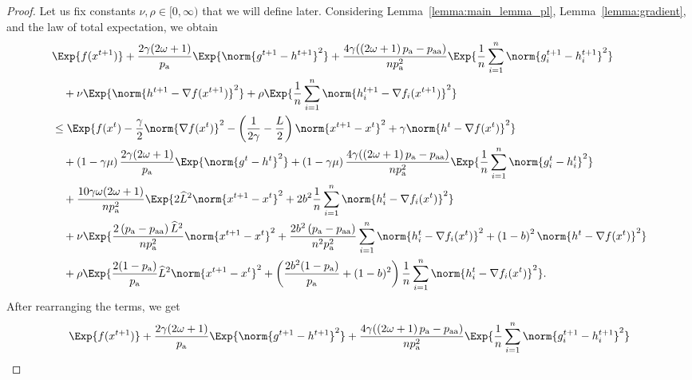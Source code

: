 \documentclass{article}
\newcommand*{\probavailable}{\ensuremath{p_{\textnormal{a}}}}
\newcommand*{\probpairaa}{\ensuremath{p_{\textnormal{aa}}}}
\begin{document}
\begin{proof}
  Let us fix constants $\nu, \rho \in [0,\infty)$ that we will define later. Considering Lemma~\ref{lemma:main_lemma_pl}, Lemma~\ref{lemma:gradient}, and the law of total expectation, we obtain
    \begin{align*}
      &\Exp{f(x^{t + 1})} + \frac{2\gamma (2\omega + 1)}{\probavailable} \Exp{\norm{g^{t+1} - h^{t+1}}^2} + \frac{4 \gamma (\left(2 \omega + 1\right)\probavailable - \probpairaa)}{n \probavailable^2} \Exp{\frac{1}{n}\sum_{i=1}^n\norm{g^{t+1}_i - h^{t+1}_i}^2}\\
      &\quad  + \nu \Exp{\norm{h^{t+1} - \nabla f(x^{t+1})}^2} + \rho \Exp{\frac{1}{n}\sum_{i=1}^n\norm{h^{t+1}_i - \nabla f_i(x^{t+1})}^2}\\
      &\leq \Exp{f(x^t) - \frac{\gamma}{2}\norm{\nabla f(x^t)}^2 - \left(\frac{1}{2\gamma} - \frac{L}{2}\right)
      \norm{x^{t+1} - x^t}^2 + \gamma \norm{h^{t} - \nabla f(x^t)}^2}\nonumber\\
      &\quad + \left(1 - \gamma \mu\right)\frac{2\gamma(2\omega + 1)}{\probavailable}\Exp{\norm{g^{t} - h^t}^2} + \left(1 - \gamma \mu\right)\frac{4 \gamma (\left(2 \omega + 1\right)\probavailable - \probpairaa)}{n \probavailable^2}\Exp{\frac{1}{n} \sum_{i=1}^n\norm{g^t_i - h^{t}_i}^2} \\
      &\quad + \frac{10 \gamma \omega (2 \omega + 1)}{n \probavailable^2} \Exp{2\widehat{L}^2\norm{x^{t+1} - x^{t}}^2 + 2b^2 \frac{1}{n}\sum_{i=1}^n \norm{h^t_i - \nabla f_i(x^{t})}^2} \\
      &\quad + \nu \Exp{\frac{2\left(\probavailable - \probpairaa\right)\widehat{L}^2}{n \probavailable^2} \norm{x^{t+1} - x^{t}}^2 + \frac{2 b^2 \left(\probavailable - \probpairaa\right)}{n^2 \probavailable^2} \sum_{i=1}^n \norm{h^t_i - \nabla f_i(x^{t})}^2 + \left(1 - b\right)^2 \norm{h^{t} - \nabla f(x^{t})}^2} \\
      &\quad + \rho \Exp{\frac{2(1 - \probavailable)}{\probavailable} \widehat{L}^2 \norm{x^{t+1} - x^{t}}^2 + \left(\frac{2 b^2 (1 - \probavailable)}{\probavailable} + (1 - b)^2\right) \frac{1}{n}\sum_{i=1}^n \norm{h^{t}_i - \nabla f_i(x^{t})}^2}.
    \end{align*}
    After rearranging the terms, we get
    \begin{align*}
      &\Exp{f(x^{t + 1})} + \frac{2\gamma (2\omega + 1)}{\probavailable} \Exp{\norm{g^{t+1} - h^{t+1}}^2} + \frac{4 \gamma (\left(2 \omega + 1\right)\probavailable - \probpairaa)}{n \probavailable^2} \Exp{\frac{1}{n}\sum_{i=1}^n\norm{g^{t+1}_i - h^{t+1}_i}^2}\\

\end{align*}
\end{proof}
\end{document}
